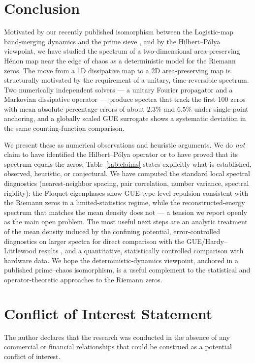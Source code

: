 \documentclass[utf8]{FrontiersinHarvard}
\begin{document}
\section{Conclusion}

Motivated by our recently published isomorphism between the Logistic-map band-merging dynamics and the prime sieve \citep{wang2026}, and by the Hilbert--P\'olya viewpoint, we have studied the spectrum of a two-dimensional area-preserving H\'enon map near the edge of chaos as a deterministic model for the Riemann zeros. The move from a 1D dissipative map to a 2D area-preserving map is structurally motivated by the requirement of a unitary, time-reversible spectrum. Two numerically independent solvers --- a unitary Fourier propagator and a Markovian dissipative operator --- produce spectra that track the first 100 zeros with mean absolute percentage errors of about $2.3\%$ and $6.5\%$ under single-point anchoring, and a globally scaled GUE surrogate shows a systematic deviation in the same counting-function comparison.

We present these as numerical observations and heuristic arguments. We do \emph{not} claim to have identified the Hilbert--P\'olya operator or to have proved that its spectrum equals the zeros; Table~\ref{tab:claims} states explicitly what is established, observed, heuristic, or conjectural. We have computed the standard local spectral diagnostics (nearest-neighbor spacing, pair correlation, number variance, spectral rigidity): the Floquet eigenphases show GUE-type level repulsion consistent with the Riemann zeros in a limited-statistics regime, while the reconstructed-energy spectrum that matches the mean density does not --- a tension we report openly as the main open problem. The most useful next steps are an analytic treatment of the mean density induced by the confining potential, error-controlled diagnostics on larger spectra for direct comparison with the GUE/Hardy--Littlewood results \citep{keating2019}, and a quantitative, statistically controlled comparison with hardware data. We hope the deterministic-dynamics viewpoint, anchored in a published prime--chaos isomorphism, is a useful complement to the statistical and operator-theoretic approaches to the Riemann zeros.

\section*{Conflict of Interest Statement}

The author declares that the research was conducted in the absence of any commercial or financial relationships that could be construed as a potential conflict of interest.
\end{document}
